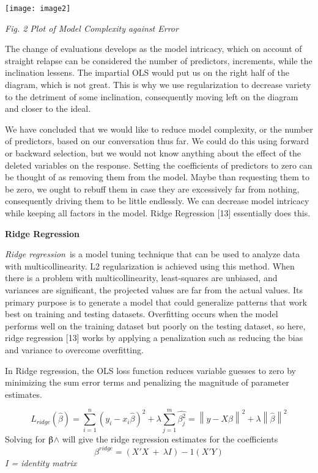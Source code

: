\documentclass{article} %
\begin{document}
\noindent \texttt{[image: image2]}

\noindent \textit{Fig. 2 Plot of Model Complexity against Error}

\noindent The change of evaluations develops as the model intricacy, which on account of straight relapse can be considered the number of predictors, increments, while the inclination lessens. The impartial OLS would put us on the right half of the diagram, which is not great. This is why we use regularization to decrease variety to the detriment of some inclination, consequently moving left on the diagram and closer to the ideal.

\noindent We have concluded that we would like to reduce model complexity, or the number of predictors, based on our conversation thus far. We could do this using forward or backward selection, but we would not know anything about the effect of the deleted variables on the response. Setting the coefficients of predictors to zero can be thought of as removing them from the model. Maybe than requesting them to be zero, we ought to rebuff them in case they are excessively far from nothing, consequently driving them to be little endlessly. We can decrease model intricacy while keeping all factors in the model. Ridge Regression [13] essentially does this.

\noindent 

\noindent \textbf{Ridge Regression}

\noindent \textit{Ridge regression}~is a model tuning technique that can be used to analyze data with multicollinearity. L2 regularization is achieved using this method. When there is a problem with multicollinearity, least-squares are unbiased, and variances are significant, the projected values are far from the actual values. Its primary purpose is to generate a model that could generalize patterns that work best on training and testing datasets. Overfitting occurs when the model performs well on the training dataset but poorly on the testing dataset, so here, ridge regression [13] works by applying a penalization such as reducing the bias and variance to overcome overfitting.~

\noindent In Ridge regression, the OLS loss function reduces variable guesses to zero by minimizing the sum error terms and penalizing the magnitude of parameter estimates.

\noindent 
\begin{equation} \label{GrindEQ__5_} 
L_{ridge}\left(\widehat{\beta }\right)=\sum^n_{i=1}{{\left(y_i-x_i\widehat{\beta }\right)}^2+\lambda \sum^m_{j=1}{\widehat{{\beta }^2_j}={\left\|y-X\widehat{\beta }\right\|}^2}}+\lambda {\left\|\widehat{\beta }\right\|}^2 
\end{equation} 
Solving for $\betaup$$\mathrm{\wedge}$ will give the ridge regression estimates for the coefficients 
\begin{equation} \label{GrindEQ__6_} 
{\beta }^{ridge}=\left(X'X\ +\ \lambda I\right)-1(X'Y) 
\end{equation} 
\textit{I = identity matrix}
\end{document}
